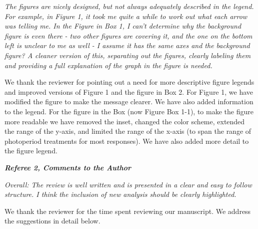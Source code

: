 \documentclass{article}
\begin{document}
\par \emph{The figures are nicely designed, but not always adequately described in the legend. For example, in Figure 1, it took me quite a while to work out what each arrow was telling me. In the Figure in Box 1, I can't determine why the background figure is even there - two other figures are covering it, and the one on the bottom left is unclear to me as well - I assume it has the same axes and the background figure? A cleaner version of this, separating out the figures, clearly labeling them and providing a full explanation of the graph in the figure is needed.}

\par We thank the reviewer for pointing out a need for more descriptive figure legends and improved versions of Figure 1 and the figure in Box 2.
For Figure 1, we have modified the figure to make the message clearer. We have also added information to the legend.
For the figure in the Box (now Figure Box 1-1),  to make the figure more readable we have removed the inset, changed the color scheme, extended the range of the y-axis, and limited the range of the x-axis (to span the range of photoperiod treatments for most responses). We have also added more detail to the figure legend.


\emph{{\bf Referee 2, Comments to the Author}}
\par \emph{Overall: The review is well written and is presented in a clear and easy to follow structure. I think the inclusion of new analysis should be clearly highlighted.}

\par We thank the reviewer for the time spent reviewing our manuscript. We address the suggestions in detail below. 
\end{document}
